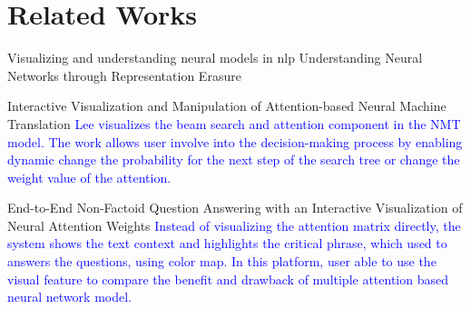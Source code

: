 \section{Related Works}


Visualizing and understanding neural models in nlp
Understanding Neural Networks through Representation Erasure


Interactive Visualization and Manipulation of Attention-based Neural Machine Translation
\textcolor{blue}{Lee visualizes the beam search and attention component in the NMT model. The work allows user involve into the decision-making process by enabling dynamic change the probability for the next step of the search tree or change the weight value of the attention.}

End-to-End Non-Factoid Question Answering with an Interactive Visualization of Neural Attention Weights
\textcolor{blue}{Instead of visualizing the attention matrix directly, the system shows the text context and highlights the critical phrase, which used to answers the questions, using color map. In this platform, user able to use the visual feature to compare the benefit and drawback of multiple attention based neural network model.}
